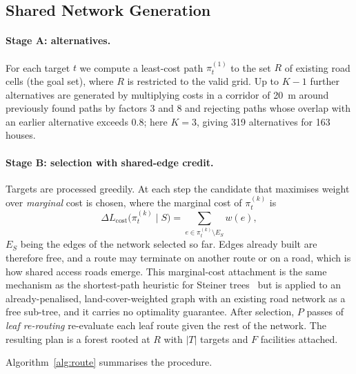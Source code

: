 \documentclass[journal]{IEEEtran}
\newcommand{\Lcost}{L_{\mathrm{cost}}}
\begin{document}
\subsection{Shared Network Generation}
\paragraph{Stage A: alternatives.} For each target $t$ we compute a least-cost path $\pi_t^{(1)}$ to the set $R$ of existing road cells (the goal set), where $R$ is restricted to the valid grid. Up to $K-1$ further alternatives are generated by multiplying costs in a corridor of 20~m around previously found paths by factors 3 and 8 and rejecting paths whose overlap with an earlier alternative exceeds 0.8; here $K=3$, giving 319 alternatives for 163 houses.

\paragraph{Stage B: selection with shared-edge credit.} Targets are processed greedily. At each step the candidate that maximises weight over \emph{marginal} cost is chosen, where the marginal cost of $\pi_t^{(k)}$ is
\begin{equation}
\Delta\Lcost\bigl(\pi_t^{(k)}\mid S\bigr)=\sum_{e\in\pi_t^{(k)}\setminus E_S}w(e),
\end{equation}
$E_S$ being the edges of the network selected so far. Edges already built are therefore free, and a route may terminate on another route or on a road, which is how shared access roads emerge. This marginal-cost attachment is the same mechanism as the shortest-path heuristic for Steiner trees~\cite{kou1981steiner,mehlhorn1988steiner} but is applied to an already-penalised, land-cover-weighted graph with an existing road network as a free sub-tree, and it carries no optimality guarantee. After selection, $P$ passes of \emph{leaf re-routing} re-evaluate each leaf route given the rest of the network. The resulting plan is a forest rooted at $R$ with $|T|$ targets and $F$ facilities attached.

Algorithm~\ref{alg:route} summarises the procedure.
\end{document}
